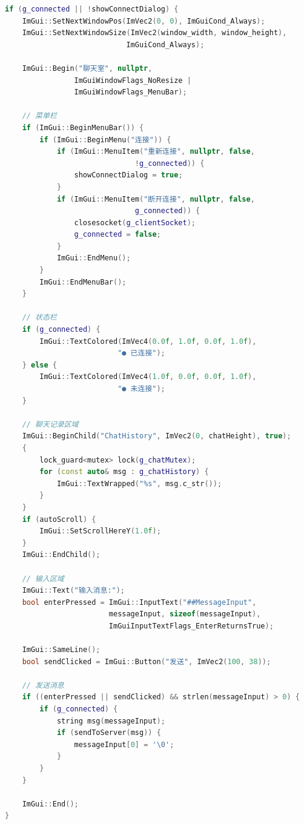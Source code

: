 \documentclass[12pt, a4paper]{article}
\begin{document}
\begin{lstlisting}[language=c++]
if (g_connected || !showConnectDialog) {
    ImGui::SetNextWindowPos(ImVec2(0, 0), ImGuiCond_Always);
    ImGui::SetNextWindowSize(ImVec2(window_width, window_height), 
                            ImGuiCond_Always);
    
    ImGui::Begin("聊天室", nullptr, 
                ImGuiWindowFlags_NoResize | 
                ImGuiWindowFlags_MenuBar);
    
    // 菜单栏
    if (ImGui::BeginMenuBar()) {
        if (ImGui::BeginMenu("连接")) {
            if (ImGui::MenuItem("重新连接", nullptr, false, 
                              !g_connected)) {
                showConnectDialog = true;
            }
            if (ImGui::MenuItem("断开连接", nullptr, false, 
                              g_connected)) {
                closesocket(g_clientSocket);
                g_connected = false;
            }
            ImGui::EndMenu();
        }
        ImGui::EndMenuBar();
    }
    
    // 状态栏
    if (g_connected) {
        ImGui::TextColored(ImVec4(0.0f, 1.0f, 0.0f, 1.0f), 
                          "● 已连接");
    } else {
        ImGui::TextColored(ImVec4(1.0f, 0.0f, 0.0f, 1.0f), 
                          "● 未连接");
    }
    
    // 聊天记录区域
    ImGui::BeginChild("ChatHistory", ImVec2(0, chatHeight), true);
    {
        lock_guard<mutex> lock(g_chatMutex);
        for (const auto& msg : g_chatHistory) {
            ImGui::TextWrapped("%s", msg.c_str());
        }
    }
    if (autoScroll) {
        ImGui::SetScrollHereY(1.0f);
    }
    ImGui::EndChild();
    
    // 输入区域
    ImGui::Text("输入消息:");
    bool enterPressed = ImGui::InputText("##MessageInput", 
                        messageInput, sizeof(messageInput), 
                        ImGuiInputTextFlags_EnterReturnsTrue);
    
    ImGui::SameLine();
    bool sendClicked = ImGui::Button("发送", ImVec2(100, 38));
    
    // 发送消息
    if ((enterPressed || sendClicked) && strlen(messageInput) > 0) {
        if (g_connected) {
            string msg(messageInput);
            if (sendToServer(msg)) {
                messageInput[0] = '\0';
            }
        }
    }
    
    ImGui::End();
}
\end{lstlisting}
\end{document}
